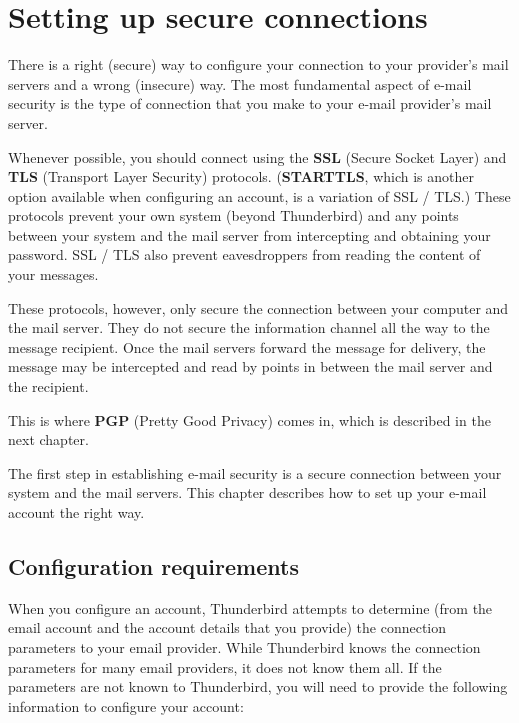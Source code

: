 \section{Setting up secure connections}

There is a right (secure) way to configure your connection to your
provider's mail servers and a wrong (insecure) way. The most fundamental
aspect of e-mail security is the type of connection that you make to
your e-mail provider's mail server.

Whenever possible, you should connect using the \textbf{SSL} (Secure
Socket Layer) and \textbf{TLS} (Transport Layer Security) protocols.
(\textbf{STARTTLS}, which is another option available when configuring
an account, is a variation of SSL / TLS.) These protocols prevent your
own system (beyond Thunderbird) and any points between your system and
the mail server from intercepting and obtaining your password. SSL / TLS
also prevent eavesdroppers from reading the content of your messages.

These protocols, however, only secure the connection between your
computer and the mail server. They do not secure the information channel
all the way to the message recipient. Once the mail servers forward the
message for delivery, the message may be intercepted and read by points
in between the mail server and the recipient.

This is where \textbf{PGP} (Pretty Good Privacy) comes in, which is
described in the next chapter.

The first step in establishing e-mail security is a secure connection
between your system and the mail servers. This chapter describes how to
set up your e-mail account the right way.

\subsection{Configuration requirements}

When you configure an account, Thunderbird attempts to determine (from
the email account and the account details that you provide) the
connection parameters to your email provider. While Thunderbird knows
the connection parameters for many email providers, it does not know
them all. If the parameters are not known to Thunderbird, you will need
to provide the following information to configure your account:

